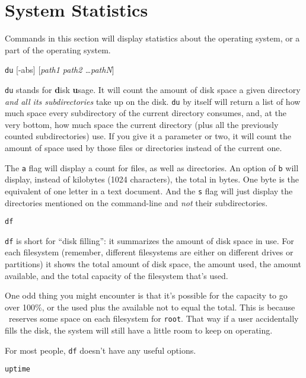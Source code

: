 \section{System Statistics}

Commands in this section will display statistics about the operating
system, or a part of the operating system.

\begin{command}
  {\tt du} [-abs] [{\sl path1 path2 \ldots pathN}]
\end{command}

{\tt du} stands for {\bf d}isk {\bf u}sage. It will count the amount
of disk space a given directory {\em and all its subdirectories} take
up on the disk. {\tt du} by itself will return a list of how much
space every subdirectory of the current directory consumes, and, at
the very bottom, how much space the current directory (plus all the
previously counted subdirectories) use. If you give it a parameter or
two, it will count the amount of space used by those files or
directories instead of the current one.

The {\tt a} flag will display a count for files, as well as
directories. An option of {\tt b} will display, instead of kilobytes
(1024 characters), the total in bytes. One byte is the equivalent of
one letter in a text document. And the {\tt s} flag will just display
the directories mentioned on the command-line and {\em not\/} their
subdirectories.

\begin{command}
  {\tt df}
\end{command}

{\tt df} is short for ``disk filling'': it summarizes the amount of
disk space in use. For each filesystem (remember, different
filesystems are either on different drives or partitions) it shows the
total amount of disk space, the amount used, the amount available, and
the total capacity of the filesystem that's used.

One odd thing you might encounter is that it's possible for the
capacity to go over 100\%, or the used plus the available not to equal
the total. This is because \unix\ reserves some space on each
filesystem for {\tt root}. That way if a user accidentally fills the
disk, the system will still have a little room to keep on operating.

For most people, {\tt df} doesn't have any useful options.

\begin{command}
  {\tt uptime}
\end{command}

